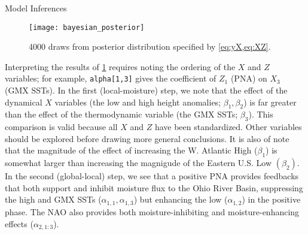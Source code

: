 \begin{block}{Model Inferences}
    \begin{figure}
        \centering
        \texttt{[image: bayesian\_posterior]}
        \caption{\num{4000} draws from posterior distribution specified by \cref{eq:yX,eq:XZ}.}
        \label{fig:posterior}
    \end{figure}
    Interpreting the results of \cref{fig:posterior} requires noting the ordering of the $X$ and $Z$ variables; for example, \texttt{alpha[1,3]} gives the coefficient of $Z_{1}$ (PNA) on $X_3$ (GMX SSTs).
    In the first (local-moisture) step, we note that the effect of the dynamical $X$ variables (the low and high height anomalies; $\beta_1, \beta_2$) is far greater than the effect of the thermodynamic variable (the GMX SSTs; $\beta_3$).
    This comparison is valid because all $X$ and $Z$ have been standardized.
    Other variables should be explored before drawing more general conclusions.
    It is also of note that the magnitude of the effect of increasing the W. Atlantic High ($\beta_1$) is somewhat larger than increasing the magnigude of the Eastern U.S. Low $(\beta_2)$.
    In the second (global-local) step, we see that a positive PNA provides feedbacks that both support and inhibit moisture flux to the Ohio River Basin, suppressing the high and GMX SSTs ($\alpha_{1,1}, \alpha_{1,3}$) but enhancing the low ($\alpha_{1,2}$) in the positive phase.
    The NAO also provides both moisture-inhibiting and moisture-enhancing effects ($\alpha_{2,1:3}$).
\end{block}
